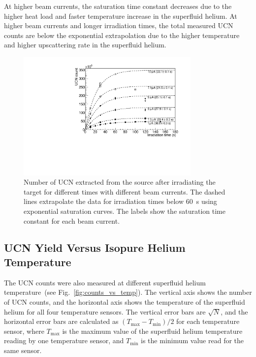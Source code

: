 At higher beam currents, the saturation time constant decreases due to
the higher heat load and faster temperature increase in the superfluid
helium. At higher beam currents and longer irradiation times, the
total measured UCN counts are below the exponential extrapolation due
to the higher temperature and higher upscattering rate in the
superfluid helium.

\begin{figure}[h!]
  \centering
  \includegraphics[width=0.8\textwidth]{UCNCounts_vs_irradTime.pdf}
  \caption{Number of UCN extracted from the source after irradiating
    the target for different times with different beam currents. The
    dashed lines extrapolate the data for irradiation times below 60~s
    using exponential saturation curves. The labels show the
    saturation time constant for each beam current. }
  \label{fig:counts_vs_irrad}
\end{figure}


\subsection{UCN Yield Versus Isopure Helium Temperature}
The UCN counts were also measured at different superfluid helium
temperature~(see Fig.~\ref{fig:counts_vs_temp}). The vertical axis
shows the number of UCN counts, and the horizontal axis shows the
temperature of the superfluid helium for all four temperature
sensors. The vertical error bars are $\sqrt{N}$, and the horizontal
error bars are calculated as $(T_{\mathrm{max}}-T_{\mathrm{min}})/2$
for each temperature sensor, where $T_{\mathrm{max}}$ is the maximum
value of the superfluid helium temperature reading by one temperature
sensor, and $T_{\mathrm{min}}$ is the minimum value read for the same
sensor.

